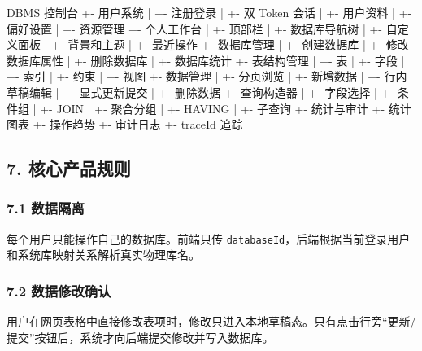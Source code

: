 \documentclass[
  a4paper,
  UTF8]{ctexart}
\newenvironment{Shaded}{}{}
\newcommand{\NormalTok}[1]{#1}
\begin{document}
\begin{Shaded}
\begin{Highlighting}[]
\NormalTok{DBMS 控制台}
\NormalTok{+{-} 用户系统}
\NormalTok{|  +{-} 注册登录}
\NormalTok{|  +{-} 双 Token 会话}
\NormalTok{|  +{-} 用户资料}
\NormalTok{|  +{-} 偏好设置}
\NormalTok{|  +{-} 资源管理}
\NormalTok{+{-} 个人工作台}
\NormalTok{|  +{-} 顶部栏}
\NormalTok{|  +{-} 数据库导航树}
\NormalTok{|  +{-} 自定义面板}
\NormalTok{|  +{-} 背景和主题}
\NormalTok{|  +{-} 最近操作}
\NormalTok{+{-} 数据库管理}
\NormalTok{|  +{-} 创建数据库}
\NormalTok{|  +{-} 修改数据库属性}
\NormalTok{|  +{-} 删除数据库}
\NormalTok{|  +{-} 数据库统计}
\NormalTok{+{-} 表结构管理}
\NormalTok{|  +{-} 表}
\NormalTok{|  +{-} 字段}
\NormalTok{|  +{-} 索引}
\NormalTok{|  +{-} 约束}
\NormalTok{|  +{-} 视图}
\NormalTok{+{-} 数据管理}
\NormalTok{|  +{-} 分页浏览}
\NormalTok{|  +{-} 新增数据}
\NormalTok{|  +{-} 行内草稿编辑}
\NormalTok{|  +{-} 显式更新提交}
\NormalTok{|  +{-} 删除数据}
\NormalTok{+{-} 查询构造器}
\NormalTok{|  +{-} 字段选择}
\NormalTok{|  +{-} 条件组}
\NormalTok{|  +{-} JOIN}
\NormalTok{|  +{-} 聚合分组}
\NormalTok{|  +{-} HAVING}
\NormalTok{|  +{-} 子查询}
\NormalTok{+{-} 统计与审计}
\NormalTok{   +{-} 统计图表}
\NormalTok{   +{-} 操作趋势}
\NormalTok{   +{-} 审计日志}
\NormalTok{   +{-} traceId 追踪}
\end{Highlighting}
\end{Shaded}

\hypertarget{ux6838ux5fc3ux4ea7ux54c1ux89c4ux5219}{%
\subsection{7.
核心产品规则}\label{ux6838ux5fc3ux4ea7ux54c1ux89c4ux5219}}

\hypertarget{ux6570ux636eux9694ux79bb}{%
\subsubsection{7.1 数据隔离}\label{ux6570ux636eux9694ux79bb}}

每个用户只能操作自己的数据库。前端只传
\texttt{databaseId}，后端根据当前登录用户和系统库映射关系解析真实物理库名。

\hypertarget{ux6570ux636eux4feeux6539ux786eux8ba4}{%
\subsubsection{7.2
数据修改确认}\label{ux6570ux636eux4feeux6539ux786eux8ba4}}

用户在网页表格中直接修改表项时，修改只进入本地草稿态。只有点击行旁``更新/提交''按钮后，系统才向后端提交修改并写入数据库。
\end{document}
